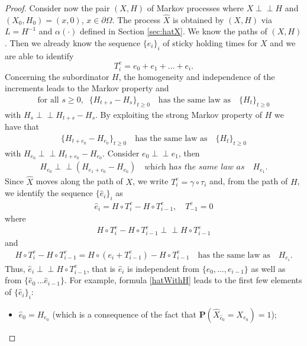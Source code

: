 \documentclass[11pt,a4paper]{article}
\newcommand{\indep}{\perp \! \! \! \perp}
\begin{document}
\begin{proof}
Consider now the pair $(X, H)$ of Markov processes where $X \indep H$ and $(X_0,H_0)=(x,0)$, $x \in \partial \Omega$. The process $\hat{X}$ is obtained by $(X,H)$ via $L=H^{-1}$ and $\alpha(\cdot)$ defined in Section \ref{sec:hatX}. We know the paths of $(X,H)$. Then we already know the sequence $\{e_i\}_i$ of  sticky holding times for $X$ and we are able to identify 
$$T^e_i = e_0 + e_1 + \ldots + e_i.$$ 
Concerning the subordinator $H$, the homogeneity and independence of the increments leads to the Markov property and
\begin{align*}
\textrm{for all } s\geq 0, \;\; \{H_{t+s}-H_s\}_{t \geq 0} \quad \textrm{has the same law as} \quad \{H_t\}_{t\geq 0}
\end{align*}
with $H_s \indep H_{t+s}-H_s$. By exploiting the strong Markov property of $H$ we have that
\begin{align*}
\{H_{t + e_0}-H_{e_0}\}_{t \geq 0} \quad \textrm{has the same law as} \quad \{H_t\}_{t\geq 0}
\end{align*}
with $H_{e_0} \indep H_{t + e_0}-H_{e_0}$. Consider $e_0 \indep e_1$, then 
\begin{align}
H_{e_0} \indep (H_{e_1+e_0} - H_{e_0}) \quad \textit{which has the same law as} \quad H_{e_1}. 
\label{hatWithH}
\end{align}
Since $\hat{X}$ moves along the path of $X$, we write $T^e_i = \gamma \circ \tau_i$ and, from the path of $H$, we identify the sequence $\{\hat{e}_i\}_i$ as
\begin{align}
\hat{e}_i = H \circ T^e_i - H \circ T^e_{i-1}, \quad T^e_{-1} = 0
\label{hatWithHb}
\end{align}   
where
\begin{align*}
H \circ T^e_i - H \circ T^e_{i-1} \indep H \circ T^e_{i-1}
\end{align*}
and
\begin{align*}
H \circ T^e_i - H \circ T^e_{i-1} = H \circ (e_i + T^e_{i-1}) - H \circ T^e_{i-1} \quad \textrm{has the same law as} \quad H_{e_i} .
\end{align*}
Thus, $\hat{e}_i \indep H \circ T^e_{i-1}$, that is $\hat{e}_i$ is independent from $\{e_0, \ldots, e_{i-1}\}$ as well as from $\{\hat{e}_0\, \ldots \hat{e}_{i-1}\}$. For example, formula \eqref{hatWithH} leads to the first few elements of $\{\hat{e}_i\}_i$:
\begin{itemize}
\item[-] $\hat{e}_0 = H_{e_0}$ (which is a consequence of the fact that $\mathbf{P}(\hat{X}_{\hat{e}_0} = X_{e_0})=1$);\\

\end{itemize}
\end{proof}
\end{document}
